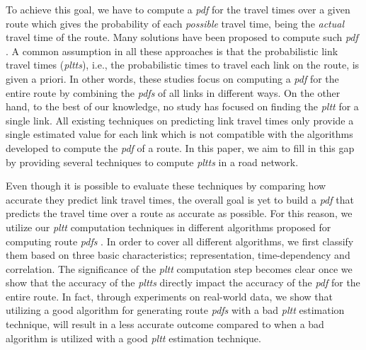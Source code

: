 To achieve this goal, we have to compute a \textit{pdf} for the travel times over a given route which gives the probability of each \textit{possible} travel time, being the \textit{actual} travel time of the route. Many solutions have been proposed to compute such \textit{pdf} \cite{Frank69,Miller-Hooks98,Miller-Hooks00, Nie09b,Seshadri10, Zockaei13,Bi-Yu13,Nie06,Hua10,Fan05,Dong12,Nie09a}. A common assumption in all these approaches is that the probabilistic link travel times (\textit{pltts}), i.e., the probabilistic times to travel each link on the route, is given a priori. In other words, these studies focus on computing a \textit{pdf} for the entire route by combining the \textit{pdfs} of all links in different ways. On the other hand, to the best of our knowledge, no study has focused on finding the \textit{pltt} for a single link. All existing techniques on predicting link travel times only provide a single estimated value for each link \cite{Pan13, Xu15} which is not compatible with the algorithms developed to compute the \textit{pdf} of a route. In this paper, we aim to fill in this gap by providing several techniques to compute \textit{pltts} in a road network.

Even though it is possible to evaluate these techniques by comparing how accurate they predict link travel times, the overall goal is yet to build a \textit{pdf} that predicts the travel time over a route as accurate as possible. For this reason, we utilize our \textit{pltt} computation techniques in different algorithms proposed for computing route \textit{pdfs} . In order to cover all different algorithms, we first classify them based on three basic characteristics; representation, time-dependency and correlation. The significance of the \textit{pltt} computation step becomes clear once we show that the accuracy of the \textit{pltts} directly impact the accuracy of the \textit{pdf} for the entire route. In fact, through experiments on real-world data, we show that utilizing a good algorithm for generating route \textit{pdfs} with a bad \textit{pltt} estimation technique, will result in a less accurate outcome compared to when a bad algorithm is utilized with a good \textit{pltt} estimation technique.

